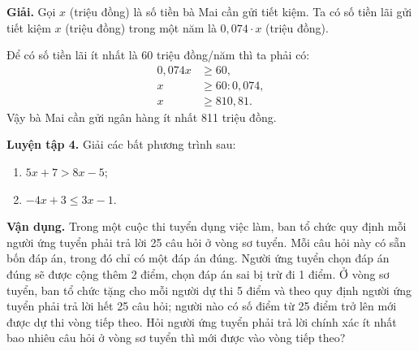 \begin{lesson}
    \textbf{Giải.} Gọi $x$ (triệu đồng) là số tiền bà Mai cần gửi tiết kiệm. Ta có số tiền lãi gửi tiết kiệm $x$ (triệu đồng) trong một năm là $0{,}074\cdot x$ (triệu đồng).

    Để có số tiền lãi ít nhất là 60 triệu đồng/năm thì ta phải có:
    \begin{align*}
        0{,}074x &\geq 60,\\
        x &\geq 60:0{,}074,\\
        x &\geq 810{,}81.
    \end{align*}
    Vậy bà Mai cần gửi ngân hàng ít nhất 811 triệu đồng.

    \textbf{Luyện tập 4.} Giải các bất phương trình sau:
    \begin{enumerate}[label=\alph*)]
        \item $5x+7>8x-5$;

        \answerline
        \item $-4x+3\leq 3x-1$.

        \answerline
    \end{enumerate}

    \textbf{Vận dụng.} Trong một cuộc thi tuyển dụng việc làm, ban tổ chức quy định mỗi người ứng tuyển phải trả lời 25 câu hỏi ở vòng sơ tuyển. Mỗi câu hỏi này có sẵn bốn đáp án, trong đó chỉ có một đáp án đúng. Người ứng tuyển chọn đáp án đúng sẽ được cộng thêm 2 điểm, chọn đáp án sai bị trừ đi 1 điểm. Ở vòng sơ tuyển, ban tổ chức tặng cho mỗi người dự thi 5 điểm và theo quy định người ứng tuyển phải trả lời hết 25 câu hỏi; người nào có số điểm từ 25 điểm trở lên mới được dự thi vòng tiếp theo. Hỏi người ứng tuyển phải trả lời chính xác ít nhất bao nhiêu câu hỏi ở vòng sơ tuyển thì mới được vào vòng tiếp theo?

    \answerline
    \answerline
\end{lesson}

